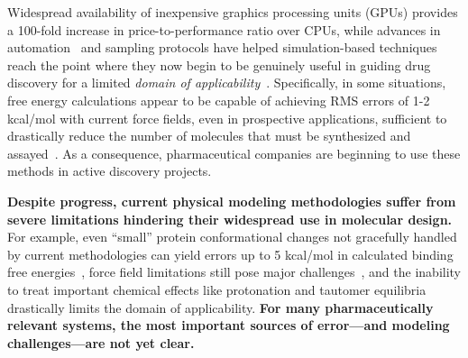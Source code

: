 \documentclass[11pt]{article}
\begin{document}
Widespread availability of inexpensive graphics processing units (GPUs) provides a 100-fold increase in price-to-performance ratio over CPUs, while advances in automation~\cite{liu_lead_2013} and sampling protocols have helped simulation-based techniques reach the point where they now begin to be genuinely useful in guiding drug discovery for a limited \emph{domain of applicability}~\cite{mikulskis_large-scale_2014, homeyer_binding_2014, sherborne_preprint_2016,  schrodinger_accurate_2015, christ_binding_2016, cui_affinity_2016, verras_free_2016}.
Specifically, in some situations, free energy calculations appear to be capable of achieving RMS errors of 1-2 kcal/mol with current force fields, even in prospective applications, sufficient to drastically reduce the number of molecules that must be synthesized and assayed~\cite{shirts_free-energy_2010}.
As a consequence, pharmaceutical companies are beginning to use these methods in active discovery projects.

\textbf{Despite progress, current physical modeling methodologies suffer from severe limitations hindering their widespread use in molecular design.}
For example, even ``small'' protein conformational changes not gracefully handled by current methodologies can yield errors up to 5 kcal/mol in calculated binding free energies~\cite{lim_sensitivity_2016}, force field limitations still pose major challenges~\cite{rocklin_blind_2013}, and the inability to treat important chemical effects like protonation and tautomer equilibria drastically limits the domain of applicability.
{\bf For many pharmaceutically relevant systems, the most important sources of error---and modeling challenges---are not yet clear.}
\end{document}
